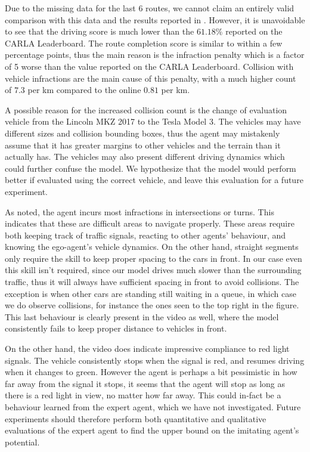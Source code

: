 Due to the missing data for the last 6 routes,
we cannot claim an entirely valid comparison with this data and the results reported in \cite{transfuser-pami}.
However, it is unavoidable to see that the driving score is much lower than the $61.18\%$ reported on the CARLA Leaderboard. 
The route completion score is similar to within a few percentage points,
thus the main reason is the infraction penalty which is a factor of 5 worse than the value reported on the CARLA Leaderboard.
Collision with vehicle infractions are the main cause of this penalty,
with a much higher count of $7.3$ per km compared to the online $0.81$ per km.

A possible reason for the increased collision count is the change of evaluation vehicle from
the Lincoln MKZ 2017 to the Tesla Model 3.
The vehicles may have different sizes and collision bounding boxes,
thus the agent may mistakenly assume that it has greater margins to other vehicles and the terrain
than it actually has.
The vehicles may also present different driving dynamics
which could further confuse the model.
We hypothesize that the model would perform better if evaluated using the correct vehicle,
and leave this evaluation for a future experiment.

As noted, the agent incurs most infractions in intersections or turns.
This indicates that these are difficult areas to navigate properly.
These areas require both keeping track of traffic signals,
reacting to other agents' behaviour,
and knowing the ego-agent's vehicle dynamics.
On the other hand,
straight segments only require the skill to keep proper spacing to the cars in front.
In our case even this skill isn't required,
since our model drives much slower than the surrounding traffic,
thus it will always have sufficient spacing in front to avoid collisions.
The exception is when other cars are standing still waiting in a queue,
in which case we do observe collisions,
for instance the ones seen to the top right in the figure.
This last behaviour is clearly present in the video as well,
where the model consistently fails to keep proper distance to vehicles in front.

On the other hand,
the video does indicate impressive compliance to red light signals.
The vehicle consistently stops when the signal is red,
and resumes driving when it changes to green.
However the agent is perhaps a bit pessimistic in how far away from the signal it stops,
it seems that the agent will stop as long as there is a red light in view,
no matter how far away.
This could in-fact be a behaviour learned from the expert agent,
which we have not investigated.
Future experiments should therefore perform both quantitative and qualitative
evaluations of the expert agent to find the upper bound on the imitating agent's potential.
